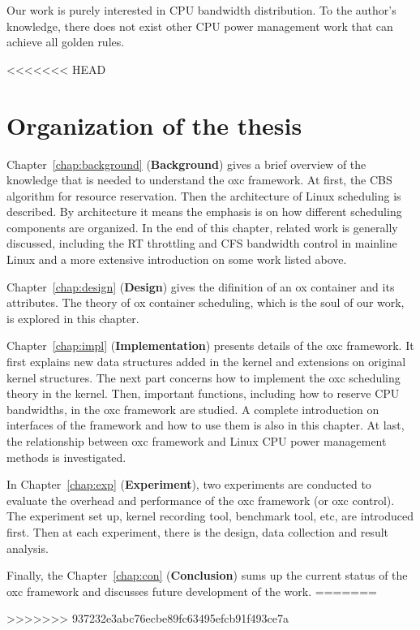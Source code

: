 Our work is purely interested in CPU bandwidth distribution.
To the author's knowledge, there does not exist other 
CPU power management work that can achieve all golden rules.

%
<<<<<<< HEAD
\section{Organization of the thesis}
Chapter~\ref{chap:background} ({\bf Background}) gives a brief overview
of the knowledge that is needed to understand the oxc framework. At first,
the CBS algorithm for resource reservation. Then the architecture of 
Linux scheduling is described. By architecture it means the emphasis is 
on how different scheduling components are organized. In the end of this
chapter, related work is generally discussed, including the RT throttling
and CFS bandwidth control in mainline Linux and a more extensive 
introduction on some work listed above.

Chapter~\ref{chap:design} ({\bf Design}) gives the difinition of an ox 
container and its attributes. The theory of ox container scheduling, which
is the soul of our work, is explored in this chapter. 

Chapter~\ref{chap:impl} ({\bf Implementation}) presents details of the oxc
framework. It first explains new data structures added in the kernel and 
extensions on original kernel structures. The next part concerns how to 
implement the oxc scheduling theory in the kernel. Then, important functions,
including how to reserve CPU bandwidths, in the oxc framework are studied.
A complete introduction on interfaces of the framework and how to use them
is also in this chapter. At last, the relationship between oxc framework
and Linux CPU power management methods is investigated.

In Chapter~\ref{chap:exp} ({\bf Experiment}), two experiments are conducted
to evaluate the overhead and performance of the oxc framework (or oxc control).
The experiment set up, kernel recording tool, benchmark tool,
etc, are introduced first. Then at each experiment, there is the design, 
data collection and result analysis.

Finally, the Chapter~\ref{chap:con} ({\bf Conclusion}) sums up the current
status of the oxc framework and discusses future development of the work. 
=======
%

>>>>>>> 937232e3abc76ecbe89fc63495efcb91f493ce7a
